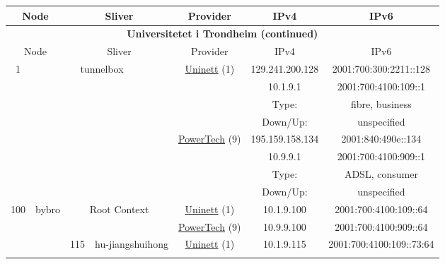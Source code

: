 \begin{small}
\begin{center}
\begin{longtable}{|c|c|c|c|c|c|c|c|}
 \multicolumn{2}{|p{8em}|}{Node} & \multicolumn{2}{|p{8em}|}{Sliver} & \multicolumn{2}{|p{8em}|}{Provider} & IPv4 & IPv6 \\ \hline
\endfirsthead
\hline
 \multicolumn{8}{|c|}{\textbf{Universitetet i Trondheim (continued)}} \\ \hline
 \multicolumn{2}{|p{8em}|}{Node} & \multicolumn{2}{|p{8em}|}{Sliver} & \multicolumn{2}{|p{8em}|}{Provider} & IPv4 & IPv6 \\ \hline
\endhead
 \multirow{8}{*}{\tiny{1}} & \multicolumn{3}{|c|}{\multirow{8}{*}{\tiny{tunnelbox}}} & \multicolumn{2}{|c|}{\multirow{4}{*}{\tiny{\href{https://www.uninett.no}{Uninett} (1)}}} & \tiny{129.241.200.128} & \tiny{2001:700:300:2211::128} \\* \cline{7-7}\cline{8-8}
  & \multicolumn{3}{|c|}{} & \multicolumn{2}{|c|}{} & \tiny{10.1.9.1} & \tiny{2001:700:4100:109::1} \\* \cline{7-7}\cline{8-8}
  & \multicolumn{3}{|c|}{} & \multicolumn{2}{|c|}{} & Type: & fibre, business \\* \cline{7-7}\cline{8-8}
  & \multicolumn{3}{|c|}{} & \multicolumn{2}{|c|}{} & Down/Up:  & unspecified \\* \cline{5-5}\cline{6-6}\cline{7-7}\cline{8-8}
  & \multicolumn{3}{|c|}{} & \multicolumn{2}{|c|}{\multirow{4}{*}{\tiny{\href{http://www.powertech.no}{PowerTech} (9)}}} & \tiny{195.159.158.134} & \tiny{2001:840:490e::134} \\* \cline{7-7}\cline{8-8}
  & \multicolumn{3}{|c|}{} & \multicolumn{2}{|c|}{} & \tiny{10.9.9.1} & \tiny{2001:700:4100:909::1} \\* \cline{7-7}\cline{8-8}
  & \multicolumn{3}{|c|}{} & \multicolumn{2}{|c|}{} & Type: & ADSL, consumer \\* \cline{7-7}\cline{8-8}
  & \multicolumn{3}{|c|}{} & \multicolumn{2}{|c|}{} & Down/Up:  & unspecified \\ \hline
 \multirow{32}{*}{\tiny{100}} & \multicolumn{1}{|l|}{\multirow{32}{*}{\tiny{bybro}}} & \multicolumn{2}{|c|}{\multirow{2}{*}{\tiny{Root Context}}} & \multicolumn{2}{|c|}{\tiny{\href{https://www.uninett.no}{Uninett} (1)}} & \tiny{10.1.9.100} & \tiny{2001:700:4100:109::64} \\* \cline{5-5}\cline{6-6}\cline{7-7}\cline{8-8}
  &  & \multicolumn{2}{|c|}{} & \multicolumn{2}{|c|}{\tiny{\href{http://www.powertech.no}{PowerTech} (9)}} & \tiny{10.9.9.100} & \tiny{2001:700:4100:909::64} \\* \cline{3-3}\cline{4-4}\cline{5-5}\cline{6-6}\cline{7-7}\cline{8-8}
  &  & \multirow{2}{*}{\tiny{115}} & \multicolumn{1}{|l|}{\multirow{2}{*}{\tiny{hu-jiangshuihong}}} & \multicolumn{2}{|c|}{\tiny{\href{https://www.uninett.no}{Uninett} (1)}} & \tiny{10.1.9.115} & \tiny{2001:700:4100:109::73:64} \\* \cline{5-5}\cline{6-6}\cline{7-7}\cline{8-8}

\end{longtable}
\end{center}
\end{small}
